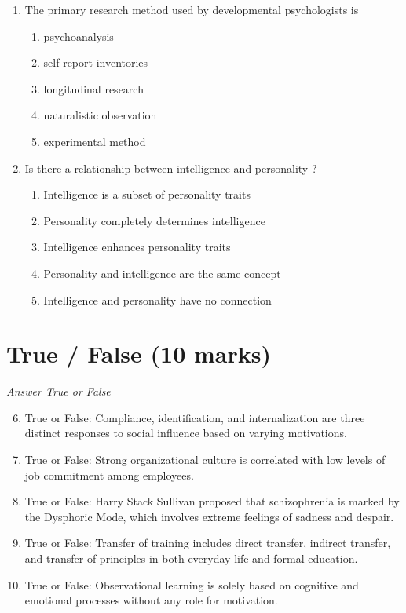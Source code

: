 \documentclass[12pt]{article}
\begin{document}
\begin{enumerate}[label=\arabic*.]
\begin{enumerate}[label=(\alph*)]
\end{enumerate}
\item The primary research method used by developmental psychologists is
\begin{enumerate}[label=(\alph*)]
    \item psychoanalysis
    \item self-report inventories
    \item longitudinal research
    \item naturalistic observation
    \item experimental method
\end{enumerate}
\item Is there a relationship between intelligence and personality ?
\begin{enumerate}[label=(\alph*)]
    \item Intelligence is a subset of personality traits
    \item Personality completely determines intelligence
    \item Intelligence enhances personality traits
    \item Personality and intelligence are the same concept
    \item Intelligence and personality have no connection
\end{enumerate}
\end{enumerate}

\section*{True / False (10 marks)}
\textit{Answer True or False}
\begin{enumerate}[label=\arabic*.]
\setcounter{enumi}{5}
\item True or False: Compliance, identification, and internalization are three distinct responses to social influence based on varying motivations.
\item True or False: Strong organizational culture is correlated with low levels of job commitment among employees.
\item True or False: Harry Stack Sullivan proposed that schizophrenia is marked by the Dysphoric Mode, which involves extreme feelings of sadness and despair.
\item True or False: Transfer of training includes direct transfer, indirect transfer, and transfer of principles in both everyday life and formal education.
\item True or False: Observational learning is solely based on cognitive and emotional processes without any role for motivation.
\end{enumerate}
\end{document}
